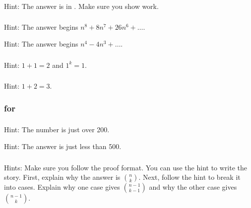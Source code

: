 \subsubsection*{ \answers}
Hint: The answer is in . Make sure you show work.

\subsubsection*{ \answers}
\begin{apart}
    \item Hint: The answer begins $n^8+8n^7+26n^6+\ldots$.
    \item Hint: The answer begins $n^4-4n^3+ \ldots$.
\end{apart}

\subsubsection*{ \answers}
Hint: $1+1 = 2$ and $1^k=1$.

\subsubsection*{ \answers}
Hint: $1+2=3$.

\subsubsection{\answers for  \subfactorialbinom}

\subsubsection*{ \answers}
\begin{apart}
    \item Hint: The number is just over 200.
    \item Hint: The answer is just less than 500.
\end{apart}

\subsubsection*{ \answers}
Hints: Make sure you follow the proof format.  You can use the hint to write the story.  First, explain why the answer is $\binom{n}{k}$.  Next, follow the hint to break it into cases.  Explain why one case gives $\binom{n-1}{k-1}$ and why the other case gives $\binom{n-1}{k}$.





